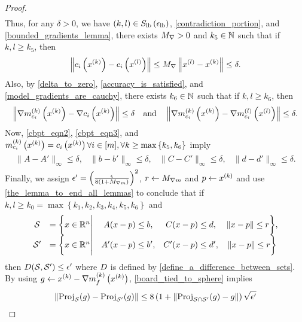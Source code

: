 \begin{proof}
\begin{align*}
\end{align*}
Thus, for any $\delta > 0$, we have
$(k, l) \in {S_{\textrm{lb}}\left(\epsilon_{\textrm{lb}}\right)}$, \cref{contradiction_portion}, and
\cref{bounded_gradients_lemma}, there exists ${M_{\nabla}} > 0$ and $k_5 \in \mathbb N$ such that if $k, l \ge k_5$, 
then
\begin{align}
\left\|c_i\left(x^{(k)}\right) - c_i\left({x^{(l)}}\right) \right\| \le {M_{\nabla}} \left\|{x^{(l)}} - x^{(k)}\right\| \le \delta. \label{cbpt_eqn2}
\end{align}
Also, by \cref{delta_to_zero}, \cref{accuracy_is_satisfied}, and \cref{model_gradients_are_cauchy}, 
there exists $k_6 \in \mathbb N$ such that if $k, l \ge k_6$, then
\begin{align}
\left\|{\nabla m_{c_i}^{(k)}\left(x^{(k)}\right)} - \nabla c_i\left(x^{(k)}\right)\right\| \le \delta \quad \textrm{and} \quad
\left\|{\nabla m_{c_i}^{(k)}\left(x^{(k)}\right)} - {\nabla m_{c_i}^{(l)}\left({x^{(l)}}\right)}\right\| \le \delta. \label{cbpt_eqn3}
\end{align}
Now, \cref{cbpt_eqn2}, \cref{cbpt_eqn3}, and $m_{c_i}^{(k)}\left(x^{(k)}\right) = c_i\left(x^{(k)}\right) \forall i \in[m], \forall k \ge \max\left\{k_5, k_6\right\}$ imply
\begin{align*}
\begin{array}{cccc}
\|A - A'\|_{\infty} \le \delta,	& \|b - b'\|_{\infty} \le \delta,		& \|C - C'\|_{\infty} \le \delta,	& \|d - d'\|_{\infty} \le \delta.
\end{array}
\end{align*}
Finally, we assign $\epsilon' = \left(\frac {\epsilon}{8\left(1 + {M_{\nabla m}}\right)}\right)^2$,
$r \gets {M_{\nabla m}}$ and $p \gets x^{(k)}$ and use \cref{the_lemma_to_end_all_lemmas}
to conclude that if $k, l \ge k_0 = \max\left\{k_1, k_2, k_3, k_4, k_5, k_6\right\}$ and
\begin{align*}
\begin{array}{ccccc}
\mathcal S  &= \bigg\{x \in \mathbb R^n \bigg|& A (x - p) \le b ,& C (x - p) \le d ,& \|x - p\| \le r \bigg\}, \\
\mathcal S' &= \bigg\{x \in \mathbb R^n \bigg|& A'(x - p) \le b',& C'(x - p) \le d',& \|x - p\| \le r \bigg\}
\end{array}
\end{align*}
then ${D}(\mathcal S, \mathcal S') \le \epsilon'$ where ${D}$ is defined by \cref{define_a_difference_between_sets}.
By using $g \gets x^{(k)} - {\nabla m_f^{(k)}\left(x^{(k)}\right)}$, \cref{board_tied_to_sphere} implies
\begin{align*}
\left\|\proj_{\mathcal S}(g) - \proj_{\mathcal S'}(g)\right\| 
\le 8\left(1 + \left\|\proj_{\mathcal S \cap \mathcal S'}(g) - g\right\|\right) \sqrt{\epsilon'} 

\end{align*}
\end{proof}
